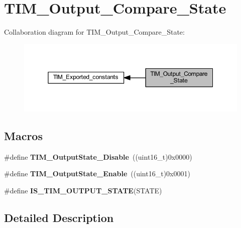 \hypertarget{group___t_i_m___output___compare___state}{}\section{T\+I\+M\+\_\+\+Output\+\_\+\+Compare\+\_\+\+State}
\label{group___t_i_m___output___compare___state}
Collaboration diagram for T\+I\+M\+\_\+\+Output\+\_\+\+Compare\+\_\+\+State\+:
\nopagebreak
\begin{figure}[H]
\begin{center}
\leavevmode
\includegraphics[width=350pt]{group___t_i_m___output___compare___state}
\end{center}
\end{figure}
\subsection*{Macros}
\begin{DoxyCompactItemize}
\item 
\mbox{\label{group___t_i_m___output___compare___state_ga4ad0f484cfa16b5190654da8278940d0}} 
\#define {\bfseries T\+I\+M\+\_\+\+Output\+State\+\_\+\+Disable}~((uint16\+\_\+t)0x0000)
\item 
\mbox{\label{group___t_i_m___output___compare___state_ga65afdda8761b6ac5ed0c0ad67c05dffe}} 
\#define {\bfseries T\+I\+M\+\_\+\+Output\+State\+\_\+\+Enable}~((uint16\+\_\+t)0x0001)
\item 
\#define {\bfseries I\+S\+\_\+\+T\+I\+M\+\_\+\+O\+U\+T\+P\+U\+T\+\_\+\+S\+T\+A\+TE}(S\+T\+A\+TE)
\end{DoxyCompactItemize}


\subsection{Detailed Description}


